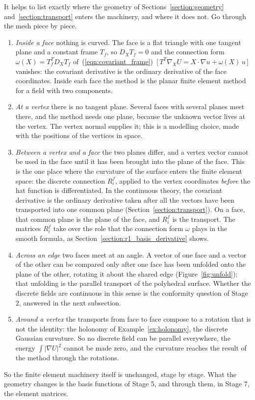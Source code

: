 It helps to list exactly where the geometry of Sections~\ref{section:geometry} and~\ref{section:transport} enters the machinery, and where it does not. Go through the mesh piece by piece.
\begin{enumerate}
\item \emph{Inside a face} nothing is curved. The face is a flat triangle with one tangent plane and a constant frame $T_f$, so $D_X T_f = 0$ and the connection form $\omega(X) = T_f^T D_X T_f$ of~(\ref{eqn:covariant_frame})~[\,$T^T\nabla_X U = X\cdot\nabla u + \omega(X)\, u$\,] vanishes: the covariant derivative is the ordinary derivative of the face coordinates. Inside each face the method is the planar finite element method for a field with two components.
\item \emph{At a vertex} there is no tangent plane. Several faces with several planes meet there, and the method needs one plane, because the unknown vector lives at the vertex. The vertex normal supplies it; this is a modelling choice, made with the positions of the vertices in space.
\item \emph{Between a vertex and a face} the two planes differ, and a vertex vector cannot be used in the face until it has been brought into the plane of the face. This is the one place where the curvature of the surface enters the finite element space: the discrete connection $R_i^f$, applied to the vertex coordinates \emph{before} the hat function is differentiated. In the continuous theory, the covariant derivative is the ordinary derivative taken after all the vectors have been transported into one common plane (Section~\ref{section:transport}). On a face, that common plane is the plane of the face, and $R_i^f$ is the transport. The matrices $R_i^f$ take over the role that the connection form $\omega$ plays in the smooth formula, as Section~\ref{section:r1_basis_derivative} shows.
\item \emph{Across an edge} two faces meet at an angle. A vector of one face and a vector of the other can be compared only after one face has been unfolded onto the plane of the other, rotating it about the shared edge (Figure~\ref{fig:unfold}); that unfolding is the parallel transport of the polyhedral surface. Whether the discrete fields are continuous in this sense is the conformity question of Stage 2, answered in the next subsection.
\item \emph{Around a vertex} the transports from face to face compose to a rotation that is not the identity: the holonomy of Example~\ref{ex:holonomy}, the discrete Gaussian curvature. So no discrete field can be parallel everywhere, the energy $\int|\nabla U|^2$ cannot be made zero, and the curvature reaches the result of the method through the rotations.
\end{enumerate}
So the finite element machinery itself is unchanged, stage by stage. What the geometry changes is the basis functions of Stage 5, and through them, in Stage 7, the element matrices.

